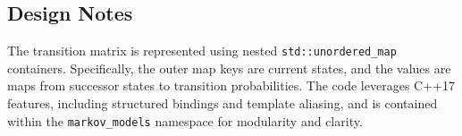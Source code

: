 \subsection{Design Notes}

The transition matrix is represented using nested \texttt{std::unordered\_map} containers. Specifically, the outer map keys are current states, and the values are maps from successor states to transition probabilities. The code leverages C++17 features, including structured bindings and template aliasing, and is contained within the \texttt{markov\_models} namespace for modularity and clarity.










